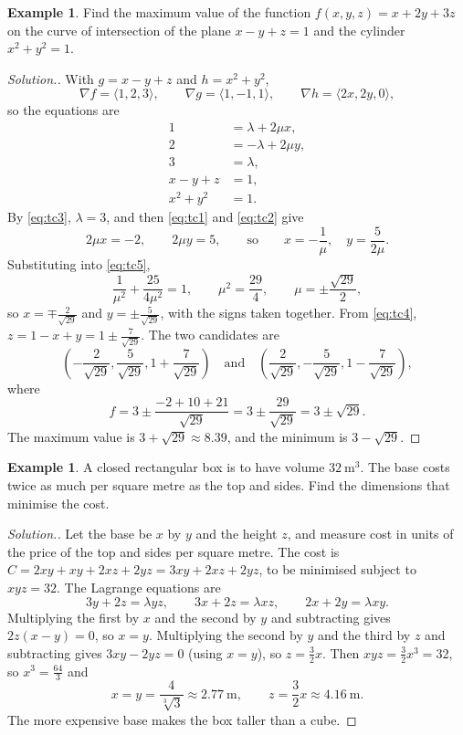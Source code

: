 \documentclass[11pt,a4paper]{article}
\theoremstyle{definition}
\newtheorem{exa}[thm]{Example}
\newenvironment{solution}
  {\renewcommand{\qedsymbol}{}\begin{proof}[\textit{Solution}.]}
  {\end{proof}}
\begin{document}
\begin{exa}
\label{ex:twoconstraints}
Find the maximum value of the function $f(x,y,z) = x + 2y + 3z$ on the curve of
intersection of the plane $x - y + z =1$ and the cylinder $x^2 + y^2 = 1$.
\end{exa}

\begin{solution}
With $g = x - y + z$ and $h = x^2 + y^2$,
\[\nabla f = \langle 1, 2, 3\rangle,\qquad \nabla g = \langle 1, -1,
1\rangle,\qquad \nabla h = \langle 2x, 2y, 0\rangle ,\]
so the equations are
\begin{align}
1 & = \lambda + 2\mu x, \label{eq:tc1}\\
2 & = -\lambda + 2\mu y, \label{eq:tc2}\\
3 & = \lambda, \label{eq:tc3}\\
x - y + z & = 1, \label{eq:tc4}\\
x^2 + y^2 & = 1 . \label{eq:tc5}
\end{align}
By \eqref{eq:tc3}, $\lambda = 3$, and then \eqref{eq:tc1} and \eqref{eq:tc2}
give
\[2\mu x = -2,\qquad 2\mu y = 5,\qquad\text{so}\qquad x = -\frac{1}{\mu},\quad
y = \frac{5}{2\mu}.\]
Substituting into \eqref{eq:tc5},
\[\frac{1}{\mu^2}+ \frac{25}{4\mu^2} = 1 ,\qquad \mu^2 = \frac{29}{4},\qquad \mu =
\pm\frac{\sqrt{29}}{2},\]
so $x = \mp \frac{2}{\sqrt{29}}$ and $y = \pm \frac{5}{\sqrt{29}}$, with the
signs taken together. From \eqref{eq:tc4},
$z = 1 - x + y = 1 \pm \frac{7}{\sqrt{29}}$. The two candidates are
\[\left(-\frac{2}{\sqrt{29}}, \frac{5}{\sqrt{29}}, 1 + \frac{7}{\sqrt{29}}\right)
\quad\text{and}\quad \left(\frac{2}{\sqrt{29}}, -\frac{5}{\sqrt{29}}, 1 -
\frac{7}{\sqrt{29}}\right),\]
where
\[f = 3 \pm\frac{-2 + 10 + 21}{\sqrt{29}} = 3 \pm \frac{29}{\sqrt{29}} = 3\pm
\sqrt{29} .\]
The maximum value is $3 + \sqrt{29}\approx 8.39$, and the minimum is
$3 - \sqrt{29}$.
\end{solution}

\begin{exa}
\label{ex:cheapestbox}
A closed rectangular box is to have volume $32\ \text{m}^3$. The base costs
twice as much per square metre as the top and sides. Find the dimensions that
minimise the cost.
\end{exa}

\begin{solution}
Let the base be $x$ by $y$ and the height $z$, and measure cost in units of the
price of the top and sides per square metre. The cost is
$C = 2xy + xy + 2xz + 2yz = 3xy + 2xz + 2yz$, to be minimised subject to
$xyz = 32$. The Lagrange equations are
\[3y + 2z = \lambda yz,\qquad 3x + 2z = \lambda xz,\qquad 2x + 2y = \lambda xy .\]
Multiplying the first by $x$ and the second by $y$ and subtracting gives
$2z(x - y) = 0$, so $x = y$. Multiplying the second by $y$ and the third by $z$
and subtracting gives $3xy - 2yz = 0$ (using $x = y$), so $z = \frac32 x$. Then
$xyz = \frac32 x^3 = 32$, so $x^3 = \frac{64}{3}$ and
\[x = y = \frac{4}{\sqrt[3]{3}}\approx 2.77\ \text{m},\qquad z = \frac32 x\approx
4.16\ \text{m}.\]
The more expensive base makes the box taller than a cube.
\end{solution}
\end{document}
